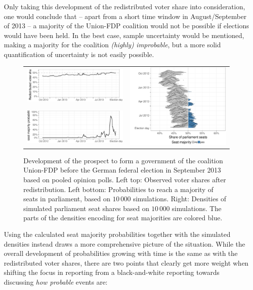 \documentclass[smallcondensed]{svjour3}     %
\begin{document}
Only taking this development of the redistributed voter share into
consideration, one would conclude that -- apart from a short
time window in August/September of 2013 -- a majority of the Union-FDP
coalition would not be possible if elections would have been held.
In the best case, sample uncertainty would be mentioned, making
a majority for the coalition {\it (highly) improbable}, but a more
solid quantification of uncertainty is not easily possible.

\begin{figure}[H]\centering
\begin{tabular}{ll}
\includegraphics[height=.15\textwidth]{figures/2013_pooled_cdufdp_rawSharesRedist.pdf}
&
\multirow{2}{*}[13ex]{\includegraphics[height=.3\textwidth]{figures/2013_pooled_cdufdp_ridgeline.pdf}}
\\
\includegraphics[height=.15\textwidth]{figures/2013_pooled_cdufdp_prob.pdf}
\end{tabular}
\caption{Development of the prospect to form a government of the coalition Union-FDP before the German federal election in September 2013 based on pooled opinion polls.
Left top: Observed voter shares after redistribution. Left bottom: Probabilities to reach a majority of seats in parliament, based on $10\,000$ simulations. Right: Densities of simulated parliament seat shares based on $10\,000$ simulations. The parts of the densities encoding for seat majorities are colored blue.
\label{fig:2013_cdufdp}
}
\end{figure}

Using the calculated seat majority probabilities together with
the simulated densities instead draws a more comprehensive picture
of the situation. While the overall development of probabilities
growing with time is the same as with the redistributed voter shares,
there are two points that clearly get more weight when shifting 
the focus in reporting from a black-and-white reporting towards
discussing {\it how probable} events are:
\end{document}
